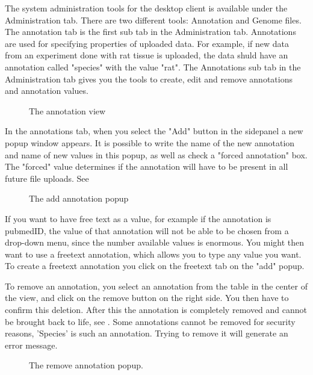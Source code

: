 The system administration tools for the desktop client is available under the Administration tab. There are two different tools: Annotation and Genome files. The annotation tab is the first sub tab in the Administration tab. Annotations are used for specifying properties of uploaded data. For example, if new data from an experiment done with rat tissue is uploaded, the data shuld have an annotation called "species" with the value "rat". The Annotations sub tab in the Administration tab gives you the tools to create, edit and remove annotations and annotation values. 
\begin{figure}[htb]
	\caption{The annotation view}
	\label{fig:annotationsView}
\end{figure}

In the annotations tab, when you select the "Add" button in the sidepanel a new popup window appears. It is possible to write the name of the new annotation and name of new values in this popup, as well as check a "forced annotation" box. The "forced" value determines if the annotation will have to be present in all future file uploads. See 

\begin{figure}[htb]
	\caption{The add annotation popup}
	\label{fig:adm_addAnnotationPopup}
\end{figure}

If you want to have free text as a value, for example if the annotation is pubmedID, the value of that annotation will not be able to be chosen from a drop-down menu, since the number available values is enormous. You might then want to use a freetext annotation, which allows you to type any value you want. To create a freetext annotation you click on the freetext tab on the "add" popup. 


To remove an annotation, you select an annotation from the table in the center of the view, and click on the remove button on the right side. You then have to confirm this deletion. After this the annotation is completely removed and cannot be brought back to life, see . Some annotations cannot be removed for security reasons, 'Species' is such an annotation. Trying to remove it will generate an error message.
\begin{figure}[h!]
\caption{The remove annotation popup.}
\label{fig:adm_desktopRemoveAnnotation}
\end{figure}
